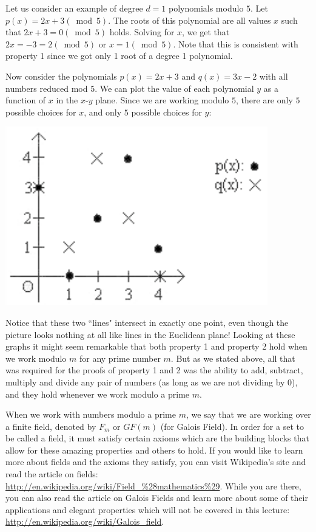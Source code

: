 \documentclass[11pt,fleqn]{article}
\begin{document}
Let us consider an example of degree $d = 1$ polynomials modulo $5$.
Let $p(x) = 2x + 3 (\bmod 5)$. 
The roots of this polynomial are all values $x$ such that $2x + 3 = 0 (\bmod 5)$ 
holds. Solving for $x$, we get that $2x = -3 = 2 (\bmod 5)$ or $x = 1 (\bmod 5)$.  
Note that this is consistent with property 1 since we got only 1 root of a degree 1 polynomial. 

Now consider the polynomials $p(x) = 2x + 3$ and $q(x) = 3x-2$ with all numbers reduced mod $5$. 
We can plot the value of each polynomial $y$ as a function of $x$ in the $x$-$y$ plane. 
Since we are working modulo $5$, there are only $5$ possible choices for $x$, and only $5$ possible choices for $y$:

\includegraphics[bb = 0 0 140 143, scale = 0.7]{graph2}

Notice that these two ``lines" intersect in exactly one point,
even though the picture looks nothing at all like lines in 
the Euclidean plane! Looking at these graphs it might seem remarkable that both property 1 and property 2 hold
when we work modulo $m$ for any prime number $m$. But as we stated above, 
all that was required for the proofs of property 1 and 2
was the ability to add, subtract, multiply and divide any pair of numbers 
(as long as we are not dividing by 0), and they hold whenever we work modulo a prime $m$. 

When we work with numbers modulo a prime $m$, we say that we are working over a
finite field, denoted by $F_m$ or $GF(m)$ (for Galois Field). In order
for a set to be called a field, it must satisfy certain axioms which are
the building blocks that allow for these amazing properties and others to hold.
If you would like to learn more about fields and the axioms they satisfy,
you can visit Wikipedia's site and read the article on fields:
\url{http://en.wikipedia.org/wiki/Field_\%28mathematics\%29}. While you are there,
you can also read the article on Galois Fields and learn more about some of their
applications and elegant properties which will not be covered in this lecture:
\url{http://en.wikipedia.org/wiki/Galois_field}.
\end{document}
